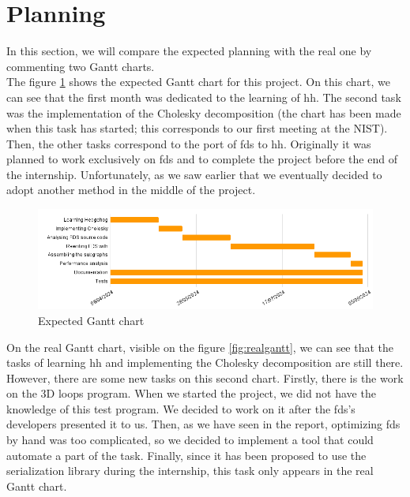 
\clearpage{}
\section{Planning}

In this section, we will compare the expected planning with the real one by
commenting two Gantt charts.\\

The figure \ref{fig:expectedgantt} shows the expected Gantt chart for this
project. On this chart, we can see that the first month was dedicated to the
learning of \gls{hh}. The second task was the implementation of the Cholesky
decomposition (the chart has been made when this task has started; this
corresponds to our first meeting at the NIST). Then, the other tasks correspond
to the port of \gls{fds} to \gls{hh}. Originally it was planned to work
exclusively on \gls{fds} and to complete the project before the end of the
internship. Unfortunately, as we saw earlier that we eventually decided to adopt
another method in the middle of the project.

\begin{figure}[h!]
  \begin{center}
    \includegraphics[scale=0.5]{img/expected-gantt-chart.png}
    \caption{Expected Gantt chart}
    \label{fig:expectedgantt}
  \end{center}
\end{figure}

On the real Gantt chart, visible on the figure \ref{fig:realgantt}, we can see
that the tasks of learning \gls{hh} and implementing the Cholesky decomposition
are still there. However, there are some new tasks on this second chart.
Firstly, there is the work on the 3D loops program. When we started the project,
we did not have the knowledge of this test program. We decided to work on it
after the \gls{fds}'s developers presented it to us. Then, as we have seen in
the report, optimizing \gls{fds} by hand was too complicated, so we decided to
implement a tool that could automate a part of the task. Finally, since it has
been proposed to use the serialization library during the internship, this task
only appears in the real Gantt chart.

